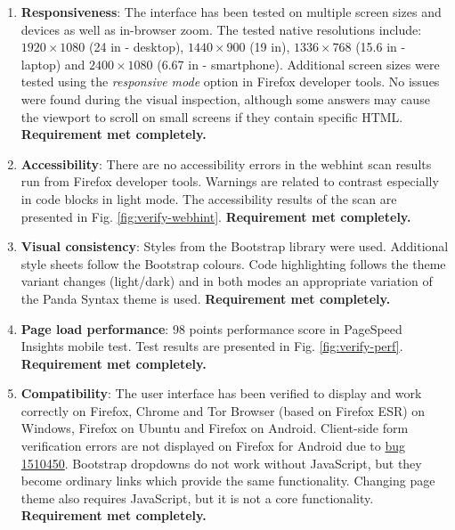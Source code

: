 \begin{enumerate}
	\item \textbf{Responsiveness}: The interface has been tested on multiple screen sizes and devices as well as in-browser zoom. The tested native resolutions include: $1920 \times 1080$ (24 in - desktop), $1440 \times 900$ (19 in), $1336 \times 768$ (15.6 in - laptop) and $2400 \times 1080$ (6.67 in - smartphone). Additional screen sizes were tested using the \textit{responsive mode} option in Firefox developer tools. No issues were found during the visual inspection, although some answers may cause the viewport to scroll on small screens if they contain specific HTML. \textbf{Requirement met completely.}

	\item \textbf{Accessibility}: There are no accessibility errors in the webhint scan results run from Firefox developer tools. Warnings are related to contrast especially in code blocks in light mode. The accessibility results of the scan are presented in Fig. \ref{fig:verify-webhint}. \textbf{Requirement met completely.}

	\item \textbf{Visual consistency}: Styles from the Bootstrap library were used. Additional style sheets follow the Bootstrap colours. Code highlighting follows the theme variant changes (light/dark) and in both modes an appropriate variation of the Panda Syntax theme is used. \textbf{Requirement met completely.}

	\item \textbf{Page load performance}: 98 points performance score in PageSpeed Insights mobile test. Test results are presented in Fig. \ref{fig:verify-perf}. \textbf{Requirement met completely.}

	\item \textbf{Compatibility}: The user interface has been verified to display and work correctly on Firefox, Chrome and Tor Browser (based on Firefox ESR) on Windows, Firefox on Ubuntu and Firefox on Android. Client-side form verification errors are not displayed on Firefox for Android due to \href{https://bugzilla.mozilla.org/show_bug.cgi?id=1510450}{bug 1510450}. Bootstrap dropdowns do not work without JavaScript, but they become ordinary links which provide the same functionality. Changing page theme also requires JavaScript, but it is not a core functionality. \textbf{Requirement met completely.}
\end{enumerate}

